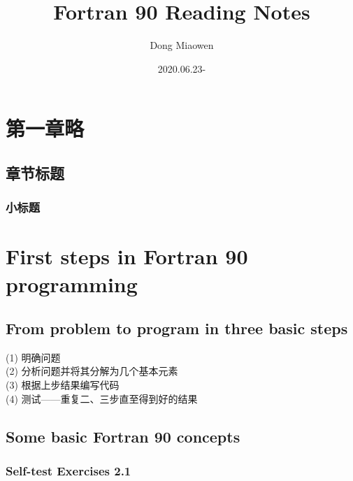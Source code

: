 \documentclass[a4paper,titlepage]{report}
\title{Fortran 90 Reading Notes}
\author{Dong Miaowen}
\date{2020.06.23-}
\theoremstyle{definition}
\begin{document}
\maketitle

\tableofcontents{}

\chapter{第一章略}

\section{章节标题}

\subsection{小标题}


\chapter{First steps in Fortran 90 programming}

\section{From problem to program in three basic steps}

(1) 明确问题 \\
(2) 分析问题并将其分解为几个基本元素 \\
(3) 根据上步结果编写代码 \\
(4) 测试——重复二、三步直至得到好的结果 \\

\section{Some basic Fortran 90 concepts}

\subsection*{Self-test Exercises 2.1}
\end{document}
